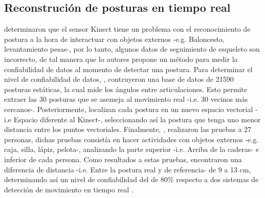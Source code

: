 \documentclass[twoside,twocolumn]{article}
\begin{document}
\subsection{Reconstruci\'on de posturas en tiempo real} \label{tr:2}
 determinaron que el sensor Kinect tiene un problema con el reconocimiento de postura a la hora de interactuar con objetos externos -e.g. Baloncesto, levantamiento pesas-, por lo tanto, algunos datos de seguimiento de esqueleto son incorrecto, de tal manera que lo autores propone un m\'etodo para medir la confiabilidad de datos al momento de detectar una postura.
\medbreak
Para determinar el nivel de confiabilidad de datos, , contruyeron una base de datos de 21590 posturas est\'aticas, la cual mide los \'angulos entre articulaciones. Esto permite  extraer las 30 posturas que se asemeja al movimiento real -i.e. 30 vecinos m\'as cercanos-.  Posteriormente, localizan cada postura en un nuevo espacio vectorial -i.e Espacio diferente al Kinect-, seleccionando as\'i la postura que tenga uno menor distancia entre los puntos vectoriales.
\medbreak
Finalmente, , realizaron las pruebas a 27 personas, dichas pruebas consist\'ia en hacer actividades con objetos externos -e.g. caja, silla, l\'apiz, pelota-, analizando la parte superior -i.e. Arriba de la caderas- e inferior de cada persona. Como resultados a estas pruebas, encontraron una diferencia de distancia -i.e. Entre la postura real y de referencia- de 9 a 13 cm, determinando as\'i un nivel de confiabilidad del de 80\% respecto a dos sistemas de detecci\'on de movimiento en tiempo real \cite{shum2011fast,shum2012real}.
\end{document}
